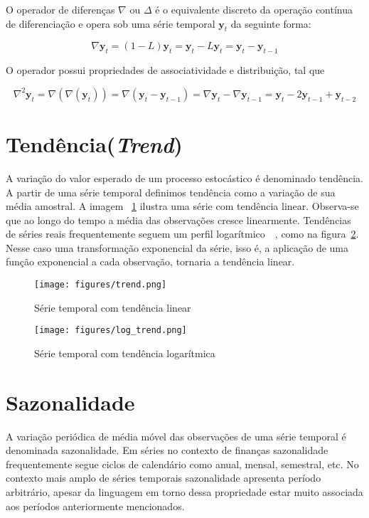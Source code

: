 O operador de diferenças $\nabla$ ou  $\Delta$ é o equivalente discreto da
operação contínua de diferenciação e opera sob uma série temporal
$\mathbf{y}_t$ da seguinte forma:

$$ \nabla \mathbf{y}_t = (1 - L)\mathbf{y}_t = \mathbf{y}_t - L\mathbf{y}_t = \mathbf{y}_t - \mathbf{y}_{t-1} $$

O operador possui propriedades de associatividade e distribuição, tal que

$$ \nabla^2 \mathbf{y}_t = \nabla(\nabla(\mathbf{y}_t)) = \nabla(\mathbf{y}_t - \mathbf{y}_{t-1}) = \nabla \mathbf{y}_t - \nabla \mathbf{y}_{t-1} = \mathbf{y}_t - 2 \mathbf{y}_{t-1} + \mathbf{y}_{t-2} $$

\section{Tendência(\emph{Trend})}

A variação do valor esperado de um processo estocástico é denominado tendência.
A partir de uma série temporal definimos tendência como a variação de sua média
amostral. A imagem ~\ref{fig:trend} ilustra uma série com tendência linear.
Observa-se que ao longo do tempo a média das observações cresce linearmente.
Tendências de séries reais frequentemente seguem um perfil
logarítmico~~\cite{chatfield}, como na figura~\ref{fig:log_trend}. Nesse caso
uma transformação exponencial da série, isso é, a aplicação de uma função
exponencial a cada observação, tornaria a tendência linear.

\begin{figure}[H]
    \centering
    \texttt{[image: figures/trend.png]}
    \caption{Série temporal com tendência linear}
    \label{fig:trend}
\end{figure}

\begin{figure}[H]
    \centering
    \texttt{[image: figures/log\_trend.png]}
    \caption{Série temporal com tendência logarítmica}
    \label{fig:log_trend}
\end{figure}

\section{Sazonalidade}\label{sec:seasonality}

A variação periódica de média móvel das observações de uma série temporal é
denominada sazonalidade. Em séries no contexto de finanças sazonalidade
frequentemente segue ciclos de calendário como anual, mensal, semestral, etc.
No contexto mais amplo de séries temporais sazonalidade apresenta período
arbitrário, apesar da linguagem em torno dessa propriedade estar muito
associada aos períodos anteriormente mencionados.

